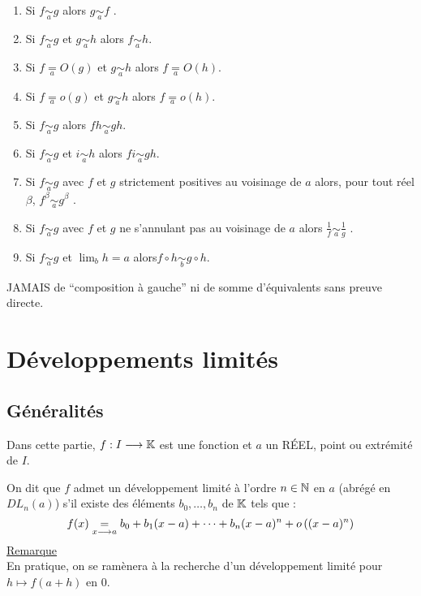 \begin{defprop}
    \begin{enumerate}
    \item Si \(f \underset{a}{\sim} g\) alors \(g \underset{a}{\sim} f\) .
    \item Si \(f \underset{a}{\sim} g\) et \(g \underset{a}{\sim} h\) alors \(f \underset{a}{\sim} h\).
    \item Si \(f \underset{a}{=} O (g)\) et \(g \underset{a}{\sim} h\) alors \(f \underset{a}{=} O (h)\).
    \item Si \(f \underset{a}{=} o (g)\) et \(g \underset{a}{\sim} h\) alors \(f \underset{a}{=} o (h)\).
    \item Si \(f \underset{a}{\sim} g\) alors \(f h \underset{a}{\sim} gh\).
    \item Si \(f \underset{a}{\sim} g\) et \(i \underset{a}{\sim} h\) alors \(f i \underset{a}{\sim} gh\).
    \item Si \(f \underset{a}{\sim} g\) avec \(f\) et \(g\) strictement positives au voisinage de \(a\) alors, pour tout réel \(\beta\), \(f ^{\beta} \underset{a}{\sim} g^{\beta}\) .
    \item Si \(f \underset{a}{\sim} g\) avec \(f\) et \(g\) ne s’annulant pas au voisinage de \(a\) alors \(\frac{1}{f} \underset{a}{\sim}\frac{1}{g}\) .
    \item Si \(f \underset{a}{\sim} g\) et \(\lim_{b} h = a\) alors\( f \circ h \underset{b}{\sim}g \circ h\).
    \end{enumerate}
    JAMAIS de “composition à gauche” ni de somme d’équivalents sans preuve directe.
\end{defprop}

\section{Développements limités}
\subsection{Généralités}
    Dans cette partie, \(f : I \longrightarrow  \mathbb{K}\) est une fonction et \(a\) un RÉEL, point ou extrémité de \(I\).
\begin{defi}
    On dit que \(f\) admet un développement limité à l’ordre \(n \in  \mathbb{N}\) en \(a\) (abrégé en \(DL_n(a)\)) s’il existe des éléments \(b_0, \dots, b_n\) de \(\mathbb{K}\) tels que :
    \[f (x) \underset{x\longrightarrow a}{=} b_0 + b_1(x - a) + \dots + b_n(x - a)^n + o \left((x - a)^n\right)\]
    \underline{Remarque}\\
    En pratique, on se ramènera à la recherche d’un développement limité pour \(h \mapsto  f (a + h)\) en \(0\).
\end{defi}

